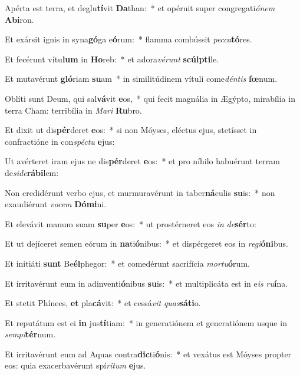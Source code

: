 \item Apérta est terra, et deglu\textbf{tí}vit \textbf{Da}than:~* et opéruit super congregati\textit{ó}\textit{nem} \textbf{Ab}\textbf{i}ron.
\item Et exársit ignis in syna\textbf{gó}ga e\textbf{ó}rum:~* flamma combússit \textit{pec}\textit{ca}\textbf{tó}res.
\item Et fecérunt vítu\textbf{lum} in \textbf{Ho}reb:~* et adora\textit{vé}\textit{runt} \textbf{scúlp}\textbf{ti}le.
\item Et mutavérunt \textbf{gló}riam \textbf{su}am~* in similitúdinem vítuli come\textit{dén}\textit{tis} \textbf{fœ}num.
\item Oblíti sunt Deum, qui sal\textbf{vá}vit \textbf{e}os,~* qui fecit magnália in Ægýpto, mirabília in terra Cham: terribília in \textit{Ma}\textit{ri} \textbf{Ru}bro.
\item Et dixit ut dis\textbf{pér}deret \textbf{e}os:~* si non Móyses, eléctus ejus, stetísset in confractióne in con\textit{spéc}\textit{tu} \textbf{e}jus:
\item Ut avérteret iram ejus ne dis\textbf{pér}deret \textbf{e}os:~* et pro níhilo habuérunt terram de\textit{si}\textit{de}\textbf{rá}\textbf{bi}lem:
\item Non credidérunt verbo ejus, et murmuravérunt in taber\textbf{ná}culis \textbf{su}is:~* non exaudiérunt \textit{vo}\textit{cem} \textbf{Dó}\textbf{mi}ni.
\item Et elevávit manum suam \textbf{su}per \textbf{e}os:~* ut prostérneret eos \textit{in} \textit{de}\textbf{sér}to:
\item Et ut dejíceret semen eórum in \textbf{na}ti\textbf{ó}nibus:~* et dispérgeret eos in \textit{re}\textit{gi}\textbf{ó}\textbf{ni}bus.
\item Et initiáti \textbf{sunt} Be\textbf{él}phegor:~* et comedérunt sacrifícia \textit{mor}\textit{tu}\textbf{ó}rum.
\item Et irritavérunt eum in adinventi\textbf{ó}nibus \textbf{su}is:~* et multiplicáta est in e\textit{is} \textit{ru}\textbf{í}na.
\item Et stetit Phínees, \textbf{et} pla\textbf{cá}vit:~* et cessá\textit{vit} \textit{quas}\textbf{sá}\textbf{ti}o.
\item Et reputátum est ei \textbf{in} jus\textbf{tí}tiam:~* in generatiónem et generatiónem usque in \textit{sem}\textit{pi}\textbf{tér}num.
\item Et irritavérunt eum ad Aquas contra\textbf{dic}ti\textbf{ó}nis:~* et vexátus est Móyses propter eos: quia exacerbavérunt spí\textit{ri}\textit{tum} \textbf{e}jus.
